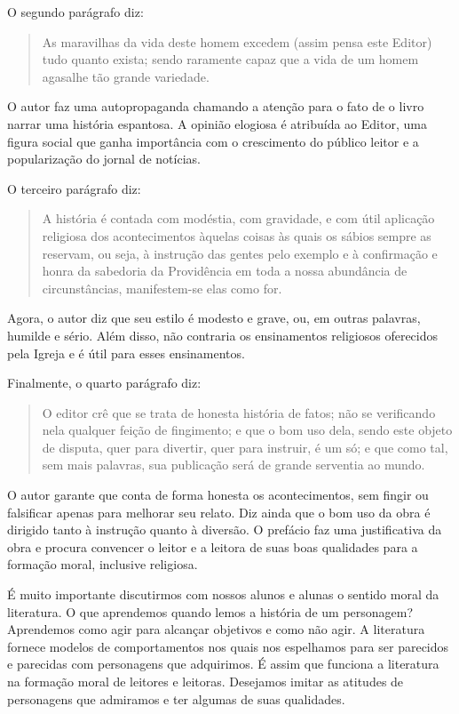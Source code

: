 \documentclass[12pt]{extarticle}
\begin{document}
O segundo parágrafo diz: 

\begin{quote}
As maravilhas da vida deste homem excedem
(assim pensa este Editor) tudo quanto exista; sendo raramente capaz que
a vida de um homem agasalhe tão grande variedade.
\end{quote}

O autor faz uma autopropaganda chamando a atenção para o fato de o livro
narrar uma história espantosa. A opinião elogiosa é atribuída ao Editor,
uma figura social que ganha importância com o crescimento do público
leitor e a popularização do jornal de notícias.

O terceiro parágrafo diz:

\begin{quote}
A história é contada com modéstia, com gravidade, e com útil aplicação
religiosa dos acontecimentos àquelas coisas às quais os sábios sempre as
reservam, ou seja, à instrução das gentes pelo exemplo e à confirmação e
honra da sabedoria da Providência em toda a nossa abundância de
circunstâncias, manifestem-se elas como for.
\end{quote}

Agora, o autor diz que seu estilo é modesto e grave, ou, em outras
palavras, humilde e sério. Além disso, não contraria os ensinamentos
religiosos oferecidos pela Igreja e é útil para esses ensinamentos.

Finalmente, o quarto parágrafo diz:

\begin{quote}
O editor crê que se trata de honesta história de fatos; não se
verificando nela qualquer feição de fingimento; e que o bom uso dela,
sendo este objeto de disputa, quer para divertir, quer para instruir, é
um só; e que como tal, sem mais palavras, sua publicação será de grande
serventia ao mundo.
\end{quote}

O autor garante que conta de forma honesta os acontecimentos, sem fingir
ou falsificar apenas para melhorar seu relato. Diz ainda que o bom uso
da obra é dirigido tanto à instrução quanto à diversão. O prefácio faz uma justificativa da obra e procura convencer o
leitor e a leitora de suas boas qualidades para a formação moral,
inclusive religiosa.

É muito importante discutirmos com nossos alunos e alunas o sentido
moral da literatura. O que aprendemos quando lemos a história de um
personagem? Aprendemos como agir para alcançar objetivos e como não
agir. A literatura fornece modelos de comportamentos nos quais nos
espelhamos para ser parecidos e parecidas com personagens que
adquirimos. É assim que funciona a literatura na formação moral de
leitores e leitoras. Desejamos imitar as atitudes de personagens que
admiramos e ter algumas de suas qualidades.
\end{document}
